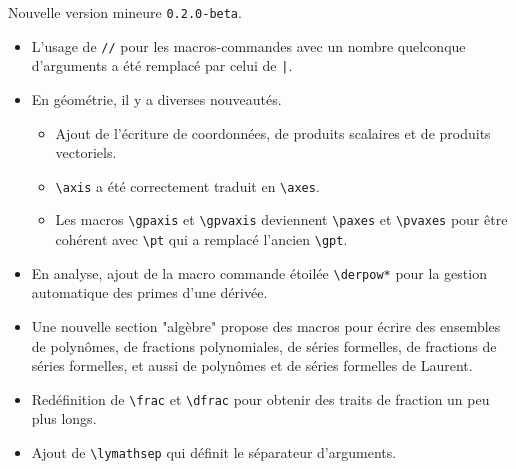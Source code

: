 Nouvelle version mineure \verb+0.2.0-beta+.

\begin{itemize}[itemsep=.5em]
    \item L'usage de \verb+//+ pour les macros-commandes avec un nombre quelconque d'arguments a été remplacé par celui de \verb+|+.


    \item En géométrie, il y a diverses nouveautés.
    \begin{itemize}[itemsep=.5em]
        \item Ajout de l'écriture de coordonnées, de produits scalaires et de produits vectoriels.

        \item \verb+\axis+ a été correctement traduit en \verb+\axes+.

        \item Les macros \verb+\gpaxis+ et \verb+\gpvaxis+ deviennent \verb+\paxes+ et \verb+\pvaxes+ pour être cohérent avec \verb+\pt+ qui a remplacé l'ancien \verb+\gpt+.
    \end{itemize}


    \item En analyse, ajout de la macro commande étoilée \verb+\derpow*+ pour la gestion automatique des primes d'une dérivée.


    \item Une nouvelle section "algèbre" propose des macros pour écrire des ensembles de polynômes, de fractions polynomiales, de séries formelles, de fractions de séries formelles, et aussi de polynômes et de séries formelles de Laurent.


    \item Redéfinition de \verb+\frac+ et \verb+\dfrac+ pour obtenir des traits de fraction un peu plus longs.


    \item Ajout de \verb+\lymathsep+ qui définit le séparateur d'arguments.
\end{itemize}
